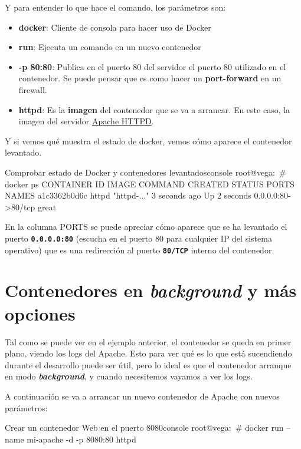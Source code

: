 Y para entender lo que hace el comando, los parámetros son:
\begin{itemize}
    \item \textbf{docker}: Cliente de consola para hacer uso de Docker
    \item \textbf{run}: Ejecuta un comando en un nuevo contenedor
    \item \textbf{-p 80:80}: Publica en el puerto 80 del servidor el puerto 80 utilizado en el contenedor. Se puede pensar que es como hacer un \textbf{port-forward} en un firewall.
    \item \textbf{httpd}: Es la \textbf{imagen} del contenedor que se va a arrancar. En este caso, la imagen del servidor \href{https://hub.docker.com/_/httpd}{Apache HTTPD}.
\end{itemize}

Y si vemos qué muestra el estado de docker, vemos cómo aparece el contenedor levantado.

\begin{mycode}{Comprobar estado de Docker y contenedores levantados}{console}{{\scriptsize }}
root@vega:~# docker ps
CONTAINER ID   IMAGE     COMMAND       CREATED         STATUS         PORTS               NAMES
a1c3362b0d6c   httpd     "httpd-..."   3 seconds ago   Up 2 seconds   0.0.0.0:80->80/tcp  great
\end{mycode}

En la columna PORTS se puede apreciar cómo aparece que se ha levantado el puerto  \textbf{ \texttt{0.0.0.0:80} } (escucha en el puerto 80 para cualquier IP del sistema operativo) que es una redirección al puerto \textbf{\texttt{80/TCP}} interno del contenedor.


\section{Contenedores en \textit{background} y más opciones}
Tal como se puede ver en el ejemplo anterior, el contenedor se queda en primer plano, viendo los logs del Apache. Esto para ver qué es lo que está sucendiendo durante el desarrollo puede ser útil, pero lo ideal es que el contenedor arranque en modo \textbf{\textit{background}}, y cuando necesitemos vayamos a ver los logs.


A continuación se va a arrancar un nuevo contenedor de Apache con nuevos parámetros:
\begin{mycode}{Crear un contenedor Web en el puerto 8080}{console}{}
root@vega:~# docker run --name mi-apache -d -p 8080:80 httpd
\end{mycode}

